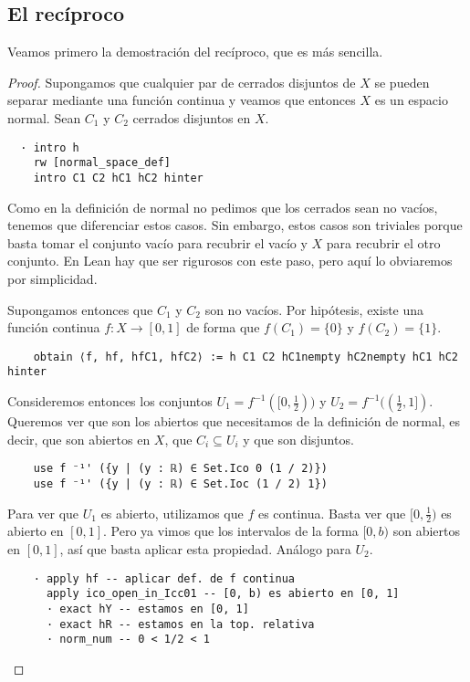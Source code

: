 \subsection{El recíproco}

Veamos primero la demostración del recíproco, que es más sencilla.

\begin{proof}

  Supongamos que cualquier par de cerrados disjuntos de $X$ se pueden separar mediante una función continua y veamos que entonces $X$ es un espacio normal. Sean $C_1$ y $C_2$ cerrados disjuntos en $X$.

  \begin{lstlisting}
  · intro h
    rw [normal_space_def]
    intro C1 C2 hC1 hC2 hinter \end{lstlisting}

  Como en la definición de normal no pedimos que los cerrados sean no vacíos, tenemos que diferenciar estos casos. Sin embargo, estos casos son triviales porque basta tomar el conjunto vacío para recubrir el vacío y $X$ para recubrir el otro conjunto. En Lean hay que ser rigurosos con este paso, pero aquí lo obviaremos por simplicidad.

  Supongamos entonces que $C_1$ y $C_2$ son no vacíos. Por hipótesis, existe una función continua $f : X \to [0, 1]$ de forma que $f(C_1) = \{0\}$ y $f(C_2) = \{1\}$.

  \begin{lstlisting}
    obtain ⟨f, hf, hfC1, hfC2⟩ := h C1 C2 hC1nempty hC2nempty hC1 hC2 hinter \end{lstlisting}

  Consideremos entonces los conjuntos $U_1 = f^{-1}([0, \frac{1}{2}))$ y $U_2 = f^{-1}((\frac{1}{2}, 1])$. Queremos ver que son los abiertos que necesitamos de la definición de normal, es decir, que son abiertos en $X$, que $C_i \subseteq U_i$ y que son disjuntos.

  \begin{lstlisting}
    use f ⁻¹' ({y | (y : ℝ) ∈ Set.Ico 0 (1 / 2)})
    use f ⁻¹' ({y | (y : ℝ) ∈ Set.Ioc (1 / 2) 1}) \end{lstlisting}

  Para ver que $U_1$ es abierto, utilizamos que $f$ es continua. Basta ver que $[0, \frac{1}{2})$ es abierto en $[0, 1]$. Pero ya vimos que los intervalos de la forma $[0, b)$ son abiertos en $[0, 1]$, así que basta aplicar esta propiedad. Análogo para $U_2$.

  \begin{lstlisting}
    · apply hf -- aplicar def. de f continua
      apply ico_open_in_Icc01 -- [0, b) es abierto en [0, 1]
      · exact hY -- estamos en [0, 1]
      · exact hR -- estamos en la top. relativa
      · norm_num -- 0 < 1/2 < 1 \end{lstlisting}


\end{proof}

